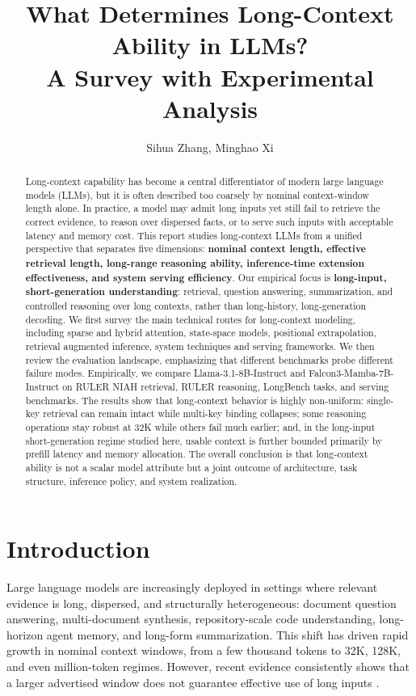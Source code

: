 \documentclass[11pt]{article}
\title{\textbf{What Determines Long-Context Ability in LLMs?}\\
\large \textbf{A Survey with Experimental Analysis}}
\author{Sihua Zhang, Minghao Xi}
\date{}
\begin{document}
\maketitle

\begin{abstract}
Long-context capability has become a central differentiator of modern large language models (LLMs), but it is often described too coarsely by nominal context-window length alone. In practice, a model may admit long inputs yet still fail to retrieve the correct evidence, to reason over dispersed facts, or to serve such inputs with acceptable latency and memory cost. This report studies long-context LLMs from a unified perspective that separates five dimensions: \textbf{nominal context length, effective retrieval length, long-range reasoning ability, inference-time extension effectiveness, and system serving efficiency}. Our empirical focus is \textbf{long-input, short-generation understanding}: retrieval, question answering, summarization, and controlled reasoning over long contexts, rather than long-history, long-generation decoding. We first survey the main technical routes for long-context modeling, including sparse and hybrid attention, state-space models, positional extrapolation, retrieval augmented inference, system techniques and serving frameworks. We then review the evaluation landscape, emphasizing that different benchmarks probe different failure modes. Empirically, we compare Llama-3.1-8B-Instruct and Falcon3-Mamba-7B-Instruct on RULER NIAH retrieval, RULER reasoning, LongBench tasks, and serving benchmarks. The results show that long-context behavior is highly non-uniform: single-key retrieval can remain intact while multi-key binding collapses; some reasoning operations stay robust at 32K while others fail much earlier; and, in the long-input short-generation regime studied here, usable context is further bounded primarily by prefill latency and memory allocation. The overall conclusion is that long-context ability is not a scalar model attribute but a joint outcome of architecture, task structure, inference policy, and system realization.
\end{abstract}

\section{Introduction}
Large language models are increasingly deployed in settings where relevant evidence is long, dispersed, and structurally heterogeneous: document question answering, multi-document synthesis, repository-scale code understanding, long-horizon agent memory, and long-form summarization. This shift has driven rapid growth in nominal context windows, from a few thousand tokens to 32K, 128K, and even million-token regimes. However, recent evidence consistently shows that a larger advertised window does not guarantee effective use of long inputs \citep{liu2024lost, hsieh2024ruler, bai2024longbench, kuratov2024babilong, bai2025longbenchv2}.
\end{document}
